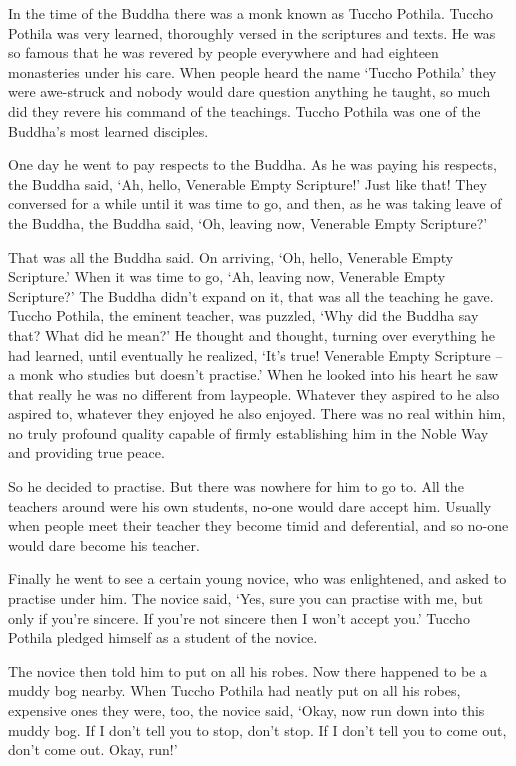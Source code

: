 In the time of the Buddha there was a monk known as Tuccho Pothila. Tuccho Pothila was very learned, thoroughly versed in the scriptures and texts. He was so famous that he was revered by people everywhere and had eighteen monasteries under his care. When people heard the name `Tuccho Pothila' they were awe-struck and nobody would dare question anything he taught, so much did they revere his command of the teachings. Tuccho Pothila was one of the Buddha's most learned disciples.

One day he went to pay respects to the Buddha. As he was paying his respects, the Buddha said, `Ah, hello, Venerable Empty Scripture!' Just like that! They conversed for a while until it was time to go, and then, as he was taking leave of the Buddha, the Buddha said, `Oh, leaving now, Venerable Empty Scripture?'

That was all the Buddha said. On arriving, `Oh, hello, Venerable Empty Scripture.' When it was time to go, `Ah, leaving now, Venerable Empty Scripture?' The Buddha didn't expand on it, that was all the teaching he gave. Tuccho Pothila, the eminent teacher, was puzzled, `Why did the Buddha say that? What did he mean?' He thought and thought, turning over everything he had learned, until eventually he realized, `It's true! Venerable Empty Scripture -- a monk who studies but doesn't practise.' When he looked into his heart he saw that really he was no different from laypeople. Whatever they aspired to he also aspired to, whatever they enjoyed he also enjoyed. There was no real  within him, no truly profound quality capable of firmly establishing him in the Noble Way and providing true peace.

So he decided to practise. But there was nowhere for him to go to. All the teachers around were his own students, no-one would dare accept him. Usually when people meet their teacher they become timid and deferential, and so no-one would dare become his teacher.

Finally he went to see a certain young novice, who was enlightened, and asked to practise under him. The novice said, `Yes, sure you can practise with me, but only if you're sincere. If you're not sincere then I won't accept you.' Tuccho Pothila pledged himself as a student of the novice.

The novice then told him to put on all his robes. Now there happened to be a muddy bog nearby. When Tuccho Pothila had neatly put on all his robes, expensive ones they were, too, the novice said, `Okay, now run down into this muddy bog. If I don't tell you to stop, don't stop. If I don't tell you to come out, don't come out. Okay, run!'

